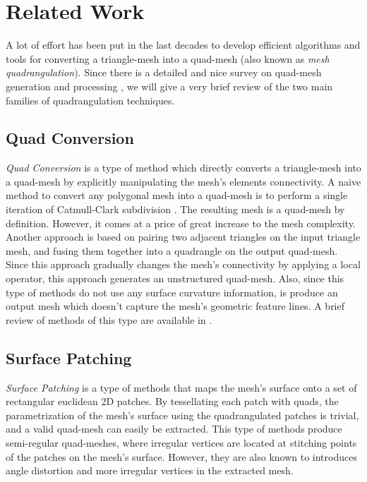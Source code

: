 \chapter{Related Work}

A lot of effort has been put in the last decades to develop efficient algorithms and tools for converting a triangle-mesh into a quad-mesh (also known as \emph{mesh quadrangulation}). Since there is a detailed and nice survey on quad-mesh generation and processing \cite{10.1111/cgf.12014}, we will give a very brief review of the two main families of quadrangulation techniques.

\section{Quad Conversion}
\emph{Quad Conversion} is a type of method which directly converts a triangle-mesh into a quad-mesh by explicitly manipulating the mesh's elements connectivity. A naive method to convert any polygonal mesh into a quad-mesh is to perform a single iteration of Catmull-Clark subdivision \cite{Catmull1978RecursivelyGB}. The resulting mesh is a quad-mesh by definition. However, it comes at a price of great increase to the mesh complexity. Another approach is based on pairing two adjacent triangles on the input triangle mesh, and fusing them together into a quadrangle on the output quad-mesh. Since this approach gradually changes the mesh's connectivity by applying a local operator, this approach generates an unstructured quad-mesh. Also, since this type of methods do not use any surface curvature information, is produce an output mesh which doesn't capture the mesh's geometric feature lines. A brief review of methods of this type are available in \cite{10.1111/cgf.12014}.

\section{Surface Patching}
\emph{Surface Patching} is a type of methods that maps the mesh's surface onto a set of rectangular euclidean 2D patches. By tessellating each patch with quads, the parametrization of the mesh's surface using the quadrangulated patches is trivial, and a valid quad-mesh can easily be extracted. This type of methods produce semi-regular quad-meshes, where irregular vertices are located at stitching points of the patches on the mesh's surface. However, they are also known to introduces angle distortion and more irregular vertices in the extracted mesh.


